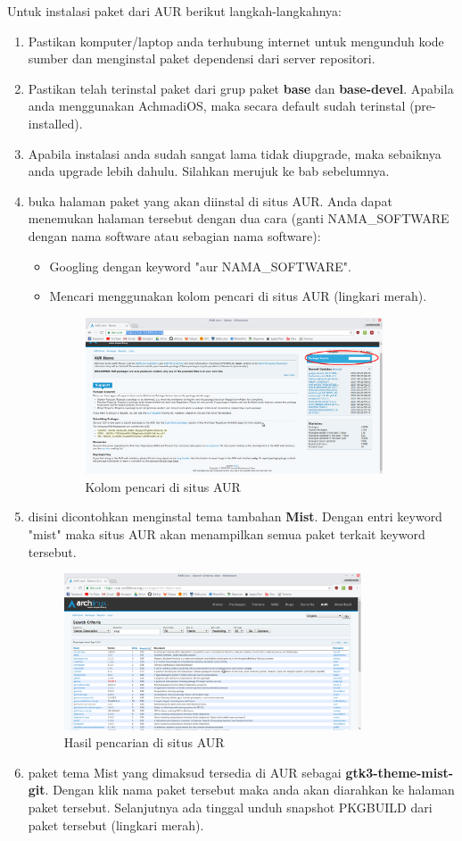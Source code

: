 \documentclass[12pt,]{article}
\begin{document}
	Untuk instalasi paket dari AUR berikut langkah-langkahnya:
	\begin{enumerate}
		\item Pastikan komputer/laptop anda terhubung internet untuk mengunduh kode sumber dan menginstal paket dependensi dari server repositori.
		\item Pastikan telah terinstal paket dari grup paket \textbf{base} dan \textbf{base-devel}.
		Apabila anda menggunakan AchmadiOS, maka secara default sudah terinstal (pre-installed).		
		\item Apabila instalasi anda sudah sangat lama tidak diupgrade, maka sebaiknya anda upgrade lebih dahulu.
		Silahkan merujuk ke bab sebelumnya.
		\item buka halaman paket yang akan diinstal di situs AUR.
		Anda dapat menemukan halaman tersebut dengan dua cara
		(ganti NAMA\_SOFTWARE dengan nama software atau sebagian nama software):
		\begin{itemize}
			\item Googling dengan keyword "aur NAMA\_SOFTWARE". 
			\item Mencari menggunakan kolom pencari di situs AUR (lingkari merah).
			\begin{figure}[!ht]
				\centering
				\includegraphics[width=250pt]{aur/cari}
				\caption{Kolom pencari di situs AUR}
			\end{figure}
		\end{itemize}
		\newpage
		\item disini dicontohkan menginstal tema tambahan \textbf{Mist}.
		Dengan entri keyword "mist" maka situs AUR akan menampilkan semua paket terkait keyword tersebut.
		\begin{figure}[!ht]
			\centering
			\includegraphics[width=250pt]{aur/list}
			\caption{Hasil pencarian di situs AUR}
		\end{figure}
		\item paket tema Mist yang dimaksud tersedia di AUR sebagai \textbf{gtk3-theme-mist-git}.
		Dengan klik nama paket tersebut maka anda akan diarahkan ke halaman paket tersebut.
		Selanjutnya ada tinggal unduh snapshot PKGBUILD dari paket tersebut (lingkari merah).
		

\end{enumerate}
\end{document}
